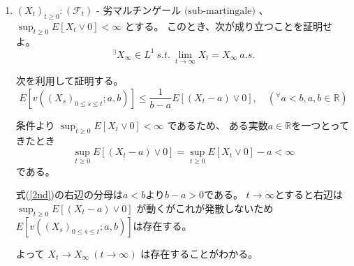\documentclass[12pt,b5paper]{ltjsarticle}
\begin{document}
\begin{enumerate}
%


      \hrulefill

 \item
      $(X_{t})_{t\geq 0} : (\mathcal{F}_{t}) \text{ - 劣マルチンゲール (sub-martingale)}$
      、
      $\sup_{t\geq 0}E\left[ X_{t} \vee 0 \right] < \infty$
      とする。
      このとき、次が成り立つことを証明せよ。
      \begin{equation}
       {}^{\exists}X_{\infty}\in L^{1} \ s.t.\ \lim_{t\to\infty}X_{t}=X_{\infty} \ a.s.
      \end{equation}

      \dotfill

      次を利用して証明する。
      \begin{equation}
       E[v((X_s)_{0\leq s\leq t};a,b)]
        \leq \frac{1}{b-a}E[(X_{t}-a)\lor 0],
        \quad ({}^{\forall}a<b , a,b\in\mathbb{R})
        \label{2nd}
      \end{equation}

      \dotfill

      条件より
      $\sup_{t\geq 0}E\left[ X_{t} \vee 0 \right] < \infty$
      であるため、
      ある実数$a\in\mathbb{R}$を一つとってきたとき
      \begin{equation}
       \sup_{t\geq 0}E\left[ (X_{t} -a) \vee 0 \right]
        = \sup_{t\geq 0}E\left[ X_{t} \vee 0 \right] -a
        < \infty
      \end{equation}
      である。

      式(\ref{2nd})の右辺の分母は$a<b$より$b-a>0$である。
      $t\to\infty$とすると右辺は
      $\sup_{t\geq 0}E\left[ (X_{t} -a) \vee 0 \right]$
      が動くがこれが発散しないため
      $E[v((X_s)_{0\leq s\leq t};a,b)]$は存在する。

      よって
      $X_{t}\to X_{\infty} \ (t\to\infty)$
      は存在することがわかる。
      

      \hrulefill

\end{enumerate}


\hrulefill
\end{document}

